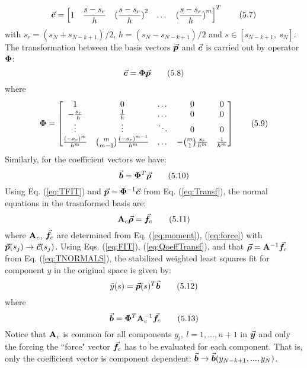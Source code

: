 \begin{equation}
	\vec{\bm{c}} = \begin{bmatrix}
		1 & \dfrac{s-s_r}{h} & (\dfrac{s-s_r}{h})\strut^2 & \dots &
		(\dfrac{s-s_r}{h})\strut^m
	\end{bmatrix}^T
	\tag{5.7}\label{eq:TPOLYBASIS}
\end{equation}
with $s_r=(s_N+s_{N-k+1})^{}/2$, $h=(s_N-s_{N-k+1})^{}/2$ and $s\in[s_{N-k+1},\
s_N]$. The transformation between the basis vectors $\vec{\bm{p}}$ and $\vec{\bm{c}}$ is
carried out by operator $\mathbf{\Phi}$:
\begin{equation}
	\vec{\bm{c}}=\mathbf{\Phi}\vec{\bm{p}}
	\tag{5.8}\label{eq:Transf}
\end{equation}
where
\begin{equation}
	\mathbf{\Phi} = \begin{bmatrix}
		1        &      0      & \dots & 0 & 0\\
		-\frac{s_r}{h} & \frac{1}{h} & \dots & 0 & 0\\
		\vdots     & \vdots      & \ddots& 0 & 0\\
		\frac{(-s_r)^m}{h^m} & \binom{m}{m-1}\frac{(-s_r)^{m-1}}{h^m} & \dots
		& -\binom{m}{1}\frac{s_r}{h^m} & \frac{1}{h^m}
	\end{bmatrix}
	\tag{5.9}\label{eq:OPERATOR}
\end{equation}
Similarly, for the coefficient vectors we have:
\begin{equation}
	\vec{\bm{b}}=\mathbf{\Phi}^T\vec{\bm{\rho}}
	\tag{5.10}\label{eq:QoeffTransf}
\end{equation}
Using Eq. (\ref{eq:TFIT}) and $\vec{\bm{p}}=\mathbf{\Phi}^{-1}\vec{\bm{c}}$ from Eq.
(\ref{eq:Transf}), 
the
normal equations in the trasnformed basis are:
\begin{equation}
	\mathbf{A}_c\vec{\bm{\rho}}=\vec{\bm{f}}_c
	\tag{5.11}\label{eq:TNORMALS}
\end{equation}
where $\mathbf{A}_c$, $\vec{\bm{f}}_c$ are determined from Eq. (\ref{eq:moment}), 
(\ref{eq:force}) 
with
$\vec{\bm{p}}(s_j)\rightarrow \vec{\bm{c}}(s_j)$. Using Eqs.
(\ref{eq:FIT}), (\ref{eq:QoeffTransf}),
and that $\vec{\bm{\rho}}=\mathbf{A}^{-1}\vec{\bm{f}}_c$ from Eq. (\ref{eq:TNORMALS}), 
the 
stabilized weighted least squares fit for component $y$ in the original
space is given by:
\begin{equation}
	\bar{y}(s)=\vec{\bm{p}}(s)^T\vec{\bm{b}}
	\tag{5.12}\label{eq:SWLSF}
\end{equation}
where
\begin{equation}
	\vec{\bm{b}} = \mathbf{\Phi}^T\mathbf{A}_c^{-1}\vec{\bm{f}}_c
	\tag{5.13}\label{eq:compCoef}
\end{equation}
Notice that $\mathbf{A}_c$ is common for all components $y_l,\ l=1,\dots, n+1$ in
$\vec{\bm{y}}$ and only the forcing the ``force" vector $\vec{\bm{f}}_c$ has to be
evaluated for each component. That is, only the coefficient vector is component
dependent: $\vec{\bm{b}}\rightarrow \vec{\bm{b}}(y_{N-k+1},...,y_N)$. 

